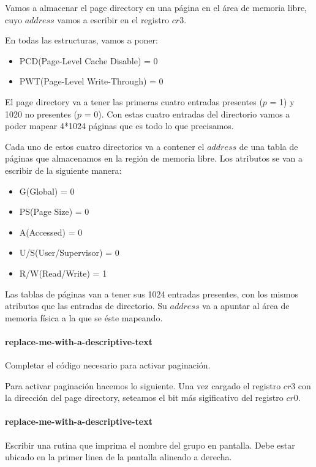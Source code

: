 Vamos a almacenar el page directory en una página en el área de memoria libre, cuyo $address$ vamos a escribir en el registro $cr3$.

En todas las estructuras, vamos a poner:
\begin{itemize}
    \item PCD(Page-Level Cache Disable) = 0 
    \item PWT(Page-Level Write-Through) = 0
\end{itemize}

El page directory va a tener las primeras cuatro entradas presentes ($p$ = 1) y 1020 no presentes ($p$ = 0). Con estas cuatro entradas del
directorio vamos a poder mapear 4*1024 páginas que es todo lo que precisamos.

Cada uno de estos cuatro directorios va a contener el $address$ de una tabla de páginas que almacenamos en la región de memoria libre.
Los atributos se van a escribir de la siguiente manera:

\begin{itemize}
    \item G(Global) = 0
    \item PS(Page Size) = 0
    \item A(Accessed) = 0
    \item U/S(User/Supervisor) = 0
    \item R/W(Read/Write) = 1
\end{itemize}

Las tablas de páginas van a tener sus 1024 entradas presentes, con los mismos atributos que las entradas de directorio. Su $address$ va a apuntar
al área de memoria física a la que se éste mapeando.

\paragraph{replace-me-with-a-descriptive-text}\label{subsubsec:ej3-c}
Completar el código necesario para activar paginación.
\hruler

Para activar paginación hacemos lo siguiente. Una vez cargado el registro $cr3$ con la dirección del page directory, seteamos el bit más
sigificativo del registro $cr0$.

\paragraph{replace-me-with-a-descriptive-text}\label{subsubsec:ej3-d}
Escribir una rutina que imprima el nombre del grupo en pantalla. Debe estar
ubicado en la primer linea de la pantalla alineado a derecha.
\hruler
{}

